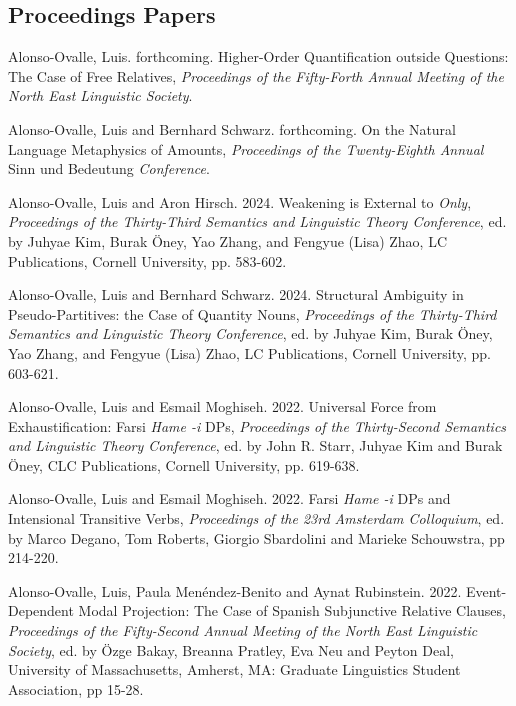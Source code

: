 \documentclass[11pt]{article}
\begin{document}
\subsection*{Proceedings Papers}

Alonso-Ovalle, Luis. forthcoming. Higher-Order Quantification outside Questions: The Case of Free Relatives, \textit{Proceedings of the Fifty-Forth Annual Meeting of the North East Linguistic Society}.

Alonso-Ovalle, Luis and Bernhard Schwarz. forthcoming. On the Natural Language Metaphysics of Amounts, \textit{Proceedings of the Twenty-Eighth Annual} Sinn und Bedeutung \textit{Conference}.

Alonso-Ovalle, Luis and Aron Hirsch. 2024. Weakening is External to \textit{Only}, \textit{Proceedings of the Thirty-Third Semantics and Linguistic Theory Conference}, ed. by Juhyae Kim, Burak \"{O}ney, Yao Zhang, and Fengyue (Lisa) Zhao, LC Publications, Cornell University, pp. 583-602.

Alonso-Ovalle, Luis and Bernhard Schwarz. 2024. Structural Ambiguity in Pseudo-Partitives: the Case of Quantity Nouns, \textit{Proceedings of the Thirty-Third Semantics and Linguistic Theory Conference}, ed. by Juhyae Kim, Burak \"{O}ney, Yao Zhang, and Fengyue (Lisa) Zhao, LC Publications, Cornell University, pp. 603-621. %


Alonso-Ovalle, Luis and Esmail Moghiseh. 2022. Universal Force from Exhaustification: Farsi \textit{Hame -i} DPs, \textit{Proceedings of the Thirty-Second Semantics and Linguistic Theory Conference}, ed. by John R. Starr, Juhyae Kim and Burak \"{O}ney, CLC Publications, Cornell University, pp. 619-638. %


Alonso-Ovalle, Luis and Esmail Moghiseh. 2022. Farsi \textit{Hame -i} DPs and Intensional Transitive Verbs, \textit{Proceedings of the 23rd Amsterdam Colloquium}, ed. by Marco Degano, Tom Roberts, Giorgio Sbardolini and Marieke Schouwstra, pp 214-220.%

Alonso-Ovalle, Luis, Paula Men\'endez-Benito and Aynat Rubinstein. 2022. Event-Dependent Modal Projection: The Case of Spanish Subjunctive Relative Clauses, \textit{Proceedings of the Fifty-Second Annual Meeting of the North East Linguistic Society}, ed. by \"{O}zge Bakay, Breanna Pratley, Eva Neu and Peyton Deal, University of Massachusetts, Amherst, MA: Graduate Linguistics Student Association, pp 15-28.
\end{document}
